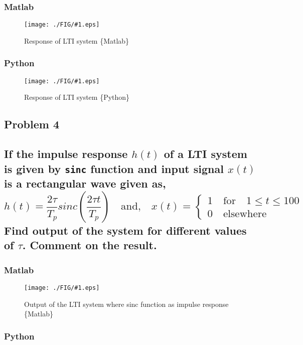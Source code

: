 \documentclass[a4paper,11pt]{article}
\newcommand\ddfrac[2]{\frac{\displaystyle #1}{\displaystyle #2}}
\newcommand{\mobs}[2]{
    \begin{figure}[H]
        \centering
        \texttt{[image: ./FIG/\#1.eps]}
        \caption{#2}
    \end{figure}
   
}
\newcommand{\pobs}[2]{
    \begin{figure}[H]
        \centering
        \texttt{[image: ./FIG/\#1.eps]}
        \caption{#2}
    \end{figure}
   
}
\begin{document}

\subsubsection*{Matlab}
\mobs{p3}{Response of LTI system  \{Matlab\} }

\subsubsection*{Python}

\pobs{p3p}{ Response of LTI system  \{Python\} }




\subsection{Problem 4}
\subsection*{If the impulse response $h(t)$ of a LTI system is given by \texttt{sinc} function and input signal $x(t)$ is a rectangular wave given as,
    $$h(t)=\ddfrac{2\tau}{T_p}sinc\left(\ddfrac{2\tau t}{T_p}\right) \quad \text{and,} \quad x(t)=\begin{cases}
            1 \quad \text{for} \quad 1\leq t \leq 100 \\
            0 \quad \text{elsewhere}
        \end{cases}$$
    Find output of the system for different values of $\tau$. Comment on the result.}

\subsubsection*{Matlab}

\mobs{p4}{Output of the LTI system where sinc function as impulse response  \{Matlab\} }

\subsubsection*{Python}
\end{document}
